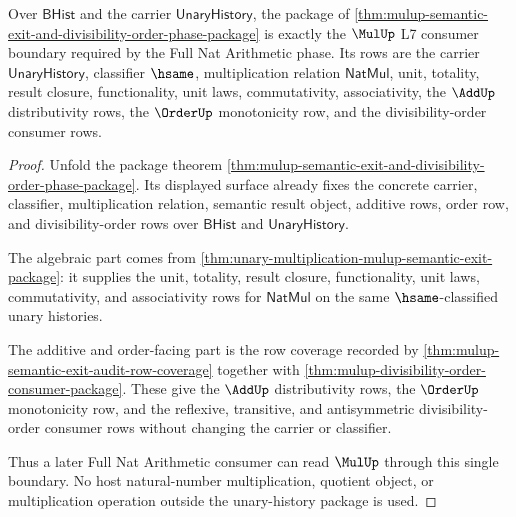 \begin{theorem}
\label{thm:mulup-full-nat-arithmetic-phase-exit-boundary}
Over $\mathsf{BHist}$ and the carrier $\mathsf{UnaryHistory}$, the package of
\autoref{thm:mulup-semantic-exit-and-divisibility-order-phase-package} is
exactly the $\MulUp$ L7 consumer boundary required by the Full Nat Arithmetic
phase. Its rows are the carrier $\mathsf{UnaryHistory}$, classifier $\hsame$,
multiplication relation $\mathsf{NatMul}$, unit, totality, result closure,
functionality, unit laws, commutativity, associativity, the $\AddUp$
distributivity rows, the $\OrderUp$ monotonicity row, and the divisibility-order
consumer rows.
\end{theorem}
\begin{proof}
Unfold the package theorem
\autoref{thm:mulup-semantic-exit-and-divisibility-order-phase-package}. Its
displayed surface already fixes the concrete carrier, classifier,
multiplication relation, semantic result object, additive rows, order row, and
divisibility-order rows over $\mathsf{BHist}$ and $\mathsf{UnaryHistory}$.

The algebraic part comes from
\autoref{thm:unary-multiplication-mulup-semantic-exit-package}: it supplies the
unit, totality, result closure, functionality, unit laws, commutativity, and
associativity rows for $\mathsf{NatMul}$ on the same $\hsame$-classified unary
histories.

The additive and order-facing part is the row coverage recorded by
\autoref{thm:mulup-semantic-exit-audit-row-coverage} together with
\autoref{thm:mulup-divisibility-order-consumer-package}. These give the
$\AddUp$ distributivity rows, the $\OrderUp$ monotonicity row, and the
reflexive, transitive, and antisymmetric divisibility-order consumer rows
without changing the carrier or classifier.

Thus a later Full Nat Arithmetic consumer can read $\MulUp$ through this single
boundary. No host natural-number multiplication, quotient object, or
multiplication operation outside the unary-history package is used.
\end{proof}

